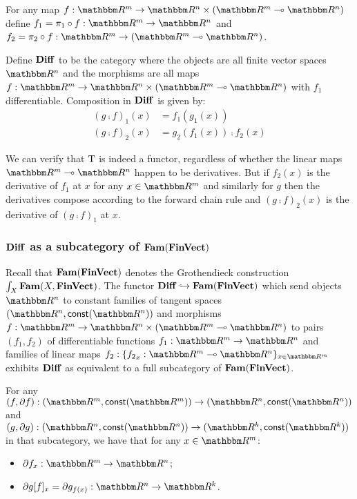 For any map $f: \RR^m \to \RR^n \times (\RR^m \linearto \RR^n)$ define $f_1 = \pi_1 \comp f: \RR^m \to \RR^n$
and $f_2 = \pi_2 \comp f: \RR^m \to (\RR^m \linearto \RR^n)$.

\begin{definition}[$\Diff$]
\label{def:auto-diff:Diff}
Define $\Diff$ to be the category where the objects are all finite vector spaces $\RR^n$ and the morphisms
are all maps $f: \RR^m \to \RR^n \times (\RR^m \linearto \RR^n)$ with $f_1$ differentiable. Composition in
$\Diff$ is given by:
\begin{align*}
(g \comp f)_1(x) &= f_1(g_1(x)) \\
(g \comp f)_2(x) &= g_2(f_1(x)) \comp f_2(x)
\end{align*}
\end{definition}

We can verify that $\mathrm{T}$ is indeed a functor, regardless of whether the linear maps $\RR^m \linearto
\RR^n$ happen to be derivatives. But if $f_2(x)$ is the derivative of $f_1$ at $x$ for any $x \in \RR^m$ and
similarly for $g$ then the derivatives compose according to the forward chain rule and $(g \comp f)_2(x)$ is
the derivative of $(g \comp f)_1$ at $x$.

\subsubsection{$\Diff$ as a subcategory of $\mathbf{Fam}(\mathbf{FinVect})$}

Recall that $\mathbf{Fam}(\mathbf{FinVect})$ denotes the Grothendieck construction $\int_{X}\mathbf{Fam}(X, \mathbf{FinVect})$. The
functor $\mathbf{Diff} \hookrightarrow \mathbf{Fam}(\mathbf{FinVect})$ which send objects $\RR^n$ to constant families of tangent
spaces $(\RR^n, \const(\RR^n))$ and morphisms $f: \RR^m \to \RR^n \times (\RR^m \linearto \RR^n)$ to pairs
$(f_1, f_2)$ of differentiable functions $f_1: \RR^m \to \RR^n$ and families of linear maps $f_2: \{{f_2}_x:
\RR^m \linearto \RR^n\}_{x \in \RR^m}$ exhibits $\Diff$ as equivalent to a full subcategory of
$\mathbf{Fam}(\mathbf{FinVect})$.

For any $(f, \partial f): (\RR^m, \const(\RR^m)) \to (\RR^n, \const(\RR^n))$ and $(g, \partial g): (\RR^n,
\const(\RR^n)) \to (\RR^k, \const(\RR^k))$ in that subcategory, we have that for any $x \in \RR^m$:
\begin{itemize}
\item $\partial f_x: \RR^m \to \RR^n$;
\item $\reindex{\partial g}{f}_x = \partial g_{f(x)}: \RR^n \to \RR^k$.
\end{itemize}

